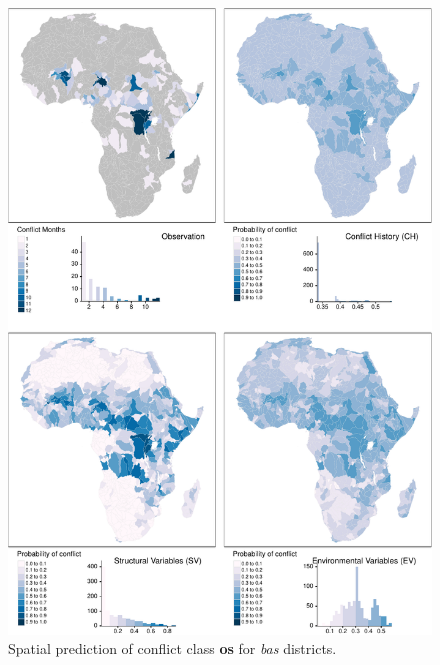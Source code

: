 \documentclass[a4paper,11pt]{article}
\begin{document}
\begin{tiny}
\begin{figure}[H]
{\centering \includegraphics{thesis_files/figure-latex/appendix-spatial-bas-os-1} 

}

\caption[Spatial prediction of conflict class \textbf{os} for \textit{bas} districts.]{Spatial prediction of conflict class \textbf{os} for \textit{bas} districts.}\label{fig:appendix-spatial-bas-os}
\end{figure}
\end{tiny}
\newpage
\end{document}
